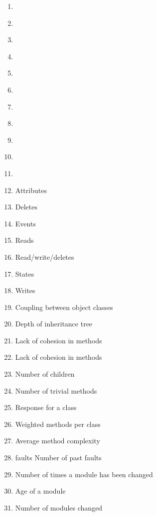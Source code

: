 \documentclass{article}
\begin{document}
{\begin{pptWide}{5}
\begin{enumerate}
\item \textbf{}
\item \textbf{}
\item \textbf{}
\item \textbf{}
\item \textbf{}
\item \textbf{}
\item \textbf{}
\item \textbf{}
\item \textbf{}
\item \textbf{}
\item \textbf{}
\item \textbf{} Attributes
\item \textbf{} Deletes
\item \textbf{} Events
\item \textbf{} Reads
\item \textbf{} Read/write/deletes
\item \textbf{} States
\item \textbf{} Writes
\item \textbf{} Coupling between object classes
\item \textbf{} Depth of inheritance tree
\item \textbf{} Lack of cohesion in methods
\item \textbf{} Lack of cohesion in methods
\item \textbf{} Number of children
\item \textbf{} Number of trivial methods
\item \textbf{} Response for a class
\item \textbf{} Weighted methods per class
\item \textbf{} Average method complexity
\item \textbf{} faults Number of past faults
\item \textbf{} Number of times a module has been changed
\item \textbf{} Age of a module
\item \textbf{} Number of modules changed

\end{enumerate}
\end{pptWide}}
\end{document}
